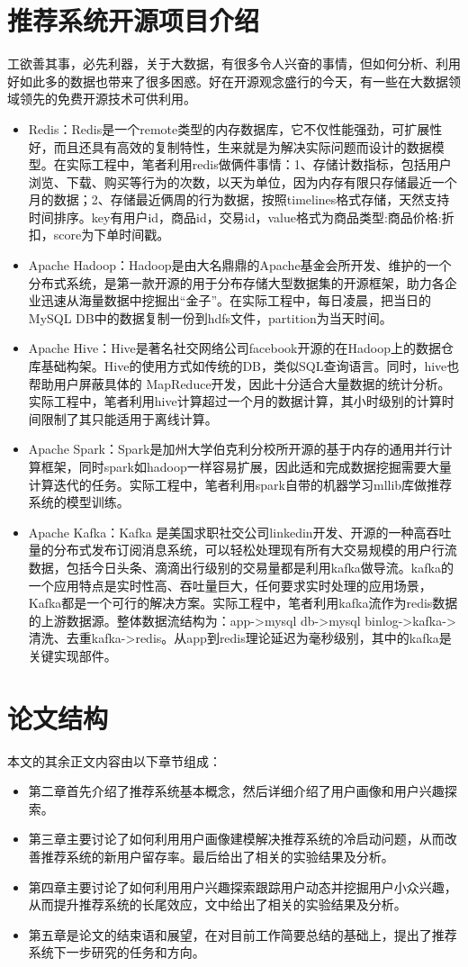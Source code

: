\section{推荐系统开源项目介绍}
工欲善其事，必先利器，关于大数据，有很多令人兴奋的事情，但如何分析、利用好如此多的数据也带来了很多困惑。好在开源观念盛行的今天，有一些在大数据领域领先的免费开源技术可供利用。
\begin{itemize}
	\item Redis：Redis是一个remote类型的内存数据库，它不仅性能强劲，可扩展性好，而且还具有高效的复制特性，生来就是为解决实际问题而设计的数据模型。在实际工程中，笔者利用redis做俩件事情：1、存储计数指标，包括用户浏览、下载、购买等行为的次数，以天为单位，因为内存有限只存储最近一个月的数据；2、存储最近俩周的行为数据，按照timelines格式存储，天然支持时间排序。key有用户id，商品id，交易id，value格式为商品类型:商品价格:折扣，score为下单时间戳。
	\item Apache Hadoop：Hadoop是由大名鼎鼎的Apache基金会所开发、维护的一个分布式系统，是第一款开源的用于分布存储大型数据集的开源框架，助力各企业迅速从海量数据中挖掘出“金子”。在实际工程中，每日凌晨，把当日的MySQL DB中的数据复制一份到hdfs文件，partition为当天时间。
	\item Apache Hive：Hive是著名社交网络公司facebook开源的在Hadoop上的数据仓库基础构架。Hive的使用方式如传统的DB，类似SQL查询语言。同时，hive也帮助用户屏蔽具体的 MapReduce开发，因此十分适合大量数据的统计分析。实际工程中，笔者利用hive计算超过一个月的数据计算，其小时级别的计算时间限制了其只能适用于离线计算。
	\item Apache Spark：Spark是加州大学伯克利分校所开源的基于内存的通用并行计算框架，同时spark如hadoop一样容易扩展，因此适和完成数据挖掘需要大量计算迭代的任务。实际工程中，笔者利用spark自带的机器学习mllib库做推荐系统的模型训练。
	\item Apache Kafka：Kafka 是美国求职社交公司linkedin开发、开源的一种高吞吐量的分布式发布订阅消息系统，可以轻松处理现有所有大交易规模的用户行流数据，包括今日头条、滴滴出行级别的交易量都是利用kafka做导流。kafka的一个应用特点是实时性高、吞吐量巨大，任何要求实时处理的应用场景，Kafka都是一个可行的解决方案。实际工程中，笔者利用kafka流作为redis数据的上游数据源。整体数据流结构为：app->mysql db->mysql binlog->kafka->清洗、去重kafka->redis。从app到redis理论延迟为毫秒级别，其中的kafka是关键实现部件。
\end{itemize}

\section{论文结构}
	本文的其余正文内容由以下章节组成：
	\begin{itemize}
		\item 第二章首先介绍了推荐系统基本概念，然后详细介绍了用户画像和用户兴趣探索。
		\item 第三章主要讨论了如何利用用户画像建模解决推荐系统的冷启动问题，从而改善推荐系统的新用户留存率。最后给出了相关的实验结果及分析。
		\item 第四章主要讨论了如何利用用户兴趣探索跟踪用户动态并挖掘用户小众兴趣，从而提升推荐系统的长尾效应，文中给出了相关的实验结果及分析。
		\item 第五章是论文的结束语和展望，在对目前工作简要总结的基础上，提出了推荐系统下一步研究的任务和方向。
	\end{itemize}